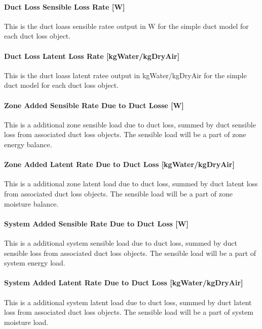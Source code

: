 \paragraph{Duct Loss Sensible Loss Rate {[}W{]}}\label{duct-loss-sensible-rate-w}

This is the duct loass sensible ratee output in W for the simple duct model for each duct loss object.

\paragraph{Duct Loss Latent Loss Rate {[}kgWater/kgDryAir{]}}\label{duct-loss-latent-rate-kgwaterkgdryair}

This is the duct loass latent ratee output in kgWater/kgDryAir for the simple duct model for each duct loss object.

\paragraph{Zone Added Sensible Rate Due to Duct Losse {[}W{]}}\label{zone-added-sensible-rate-to-duct-loss-w}

This is a additional zone sensible load due to duct loss, summed by duct sensible loss from associated duct loss objects. The sensible load will be a part of zone energy balance.

\paragraph{Zone Added Latent Rate Due to Duct Loss {[}kgWater/kgDryAir{]}}\label{zone-added-latent-rate-to-duct-loss-kgwaterkgdryair}

This is a additional zone latent load due to duct loss, summed by duct latent loss from associated duct loss objects. The sensible load will be a part of zone moisture balance.

\paragraph{System Added Sensible Rate Due to Duct Loss {[}W{]}}\label{system-added-sensible-rate-to-duct-loss-w}

This is a additional system sensible load due to duct loss, summed by duct sensible loss from associated duct loss objects. The sensible load will be a part of system energy load.

\paragraph{System Added Latent Rate Due to Duct Loss {[}kgWater/kgDryAir{]}}\label{system-added-latent-rate-to-duct-loss-w-kgwaterkgdryair}

This is a additional system latent load due to duct loss, summed by duct latent loss from associated duct loss objects. The sensible load will be a part of system moisture load.

